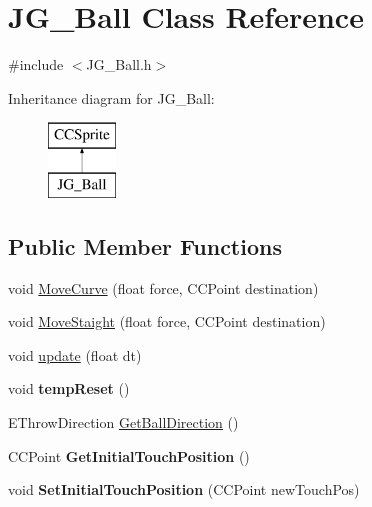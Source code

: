 \hypertarget{class_j_g___ball}{\section{J\-G\-\_\-\-Ball Class Reference}
\label{class_j_g___ball}
}


{\ttfamily \#include $<$J\-G\-\_\-\-Ball.\-h$>$}

Inheritance diagram for J\-G\-\_\-\-Ball\-:\begin{figure}[H]
\begin{center}
\leavevmode
\includegraphics[height=2.000000cm]{class_j_g___ball}
\end{center}
\end{figure}
\subsection*{Public Member Functions}
\begin{DoxyCompactItemize}
\item 
void \hyperlink{class_j_g___ball_a601eda0b1aaf9d4c8fdd31d36234a6c1}{Move\-Curve} (float force, C\-C\-Point destination)
\item 
void \hyperlink{class_j_g___ball_afa347dae4a20695cf506375b798cb2f3}{Move\-Staight} (float force, C\-C\-Point destination)
\item 
void \hyperlink{class_j_g___ball_a21c06d1a10aa8fdcc3d8e63a82f221fe}{update} (float dt)
\item 
\hypertarget{class_j_g___ball_adb4350ed0da24e5499c3402bc322f559}{void {\bfseries temp\-Reset} ()}\label{class_j_g___ball_adb4350ed0da24e5499c3402bc322f559}

\item 
E\-Throw\-Direction \hyperlink{class_j_g___ball_a94843b91ab6f8cddbb2b90de6daeb531}{Get\-Ball\-Direction} ()
\item 
\hypertarget{class_j_g___ball_a0ad42506b43718f14ccb45f163d92999}{C\-C\-Point {\bfseries Get\-Initial\-Touch\-Position} ()}\label{class_j_g___ball_a0ad42506b43718f14ccb45f163d92999}

\item 
\hypertarget{class_j_g___ball_a628e6f457315f1af9d9638834dff91e0}{void {\bfseries Set\-Initial\-Touch\-Position} (C\-C\-Point new\-Touch\-Pos)}\label{class_j_g___ball_a628e6f457315f1af9d9638834dff91e0}

\end{DoxyCompactItemize}

